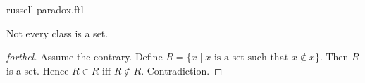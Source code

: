 \documentclass{naproche-library}
\begin{document}
\begin{smodule}[title=Russell's Paradox]{russell-paradox.ftl}

\begin{theorem}[forthel,title=Russell's Paradox,id=russell_paradox]
  Not every class is a set.
\end{theorem}
\begin{proof}[forthel]
  Assume the contrary.
  Define $R = \{x \mid x\text{ is a set such that }x \notin x\}$.
  Then $R$ is a set.
  Hence $R \in R$ iff $R \notin R$.
  Contradiction.
\end{proof}
\end{smodule}
\end{document}

